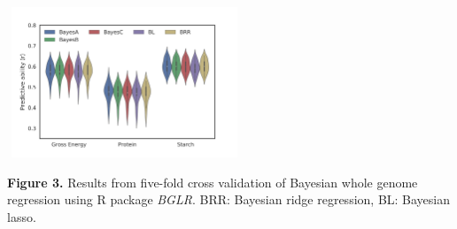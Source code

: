 \documentclass[a0paper,portrait]{baposter}
\begin{document}
\begin{poster}
{}
{
\begin{center}
\includegraphics [height=45mm, width=70mm] {r_SAP-SPG_Models.png}
\end{center}
\textbf{Figure 3.} Results from five-fold cross validation of Bayesian whole genome regression using R package \textit{BGLR}. BRR: Bayesian ridge regression, BL: Bayesian lasso.
}
{
\begin{center}

\end{center}}
\end{poster}
\end{document}
